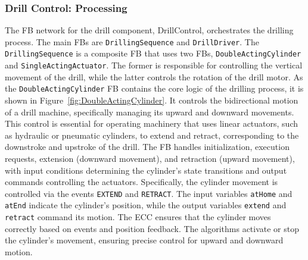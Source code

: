 \begin{bibunit}
\subsubsection{Drill Control: Processing}
The FB network for the drill component, DrillControl, orchestrates the drilling process. The main FBs are \texttt{DrillingSequence} and \texttt{DrillDriver}. The \texttt{DrillingSequence} is a composite FB that uses two FBs, \texttt{DoubleActingCylinder} and \texttt{SingleActingAc\-tu\-a\-tor}. The former is responsible for controlling the vertical movement of the drill, while the latter controls the rotation of the drill motor. As the \texttt{DoubleActingCylinder} FB contains the core logic of the drilling process, it is shown in Figure~\ref{fig:DoubleActingCylinder}. It controls the bidirectional motion of a drill machine, specifically managing its upward and downward movements. This control is essential for operating machinery that uses linear actuators, such as hydraulic or pneumatic cylinders, to extend and retract, corresponding to the downstroke and upstroke of the drill. The FB handles initialization, execution requests, extension (downward movement), and retraction (upward movement), with input conditions determining the cylinder's state transitions and output commands controlling the actuators.
Specifically, the cylinder movement is controlled via the events \texttt{EXTEND} and \texttt{RETRACT}. The input variables \texttt{atHome} and \texttt{atEnd} indicate the cylinder's position, while the output variables \texttt{extend} and \texttt{retract} command its motion. The ECC ensures that the cylinder moves correctly based on events and position feedback. The algorithms activate or stop the cylinder's movement, ensuring precise control for upward and downward motion.


\end{bibunit}
